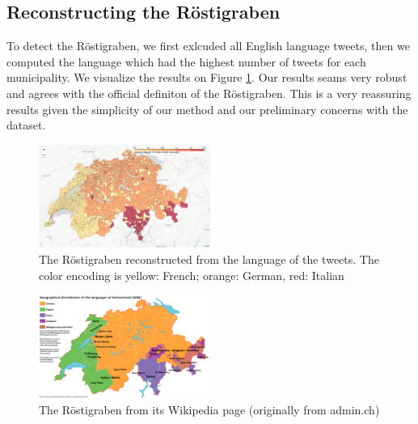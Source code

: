 \subsection{Reconstructing the R\"ostigraben}
To detect the R\"ostigraben, we first exlcuded all English language tweets, then we computed the language which had the highest number of tweets for each municipality. We visualize the results on Figure \ref{rosti_map}. Our results seams very robust and agrees with the official definiton of the R\"ostigraben. This is a very reassuring results given the simplicity of our method and our preliminary concerns with the dataset.

\begin{figure}[h]
  \includegraphics[width=0.5\textwidth]{images/rosti_map.png}
  \caption{The R\"ostigraben reconstructed from the language of the tweets. The color encoding is yellow: French; orange: German, red: Italian}
  \label{rosti_map}
\end{figure}

\begin{figure}[h]
  \includegraphics[width=0.5\textwidth]{images/Map_Languages_CH.png}
  \caption{The R\"ostigraben from its Wikipedia page (originally from admin.ch)}
  \label{rosti_map_wiki}
\end{figure}

 

